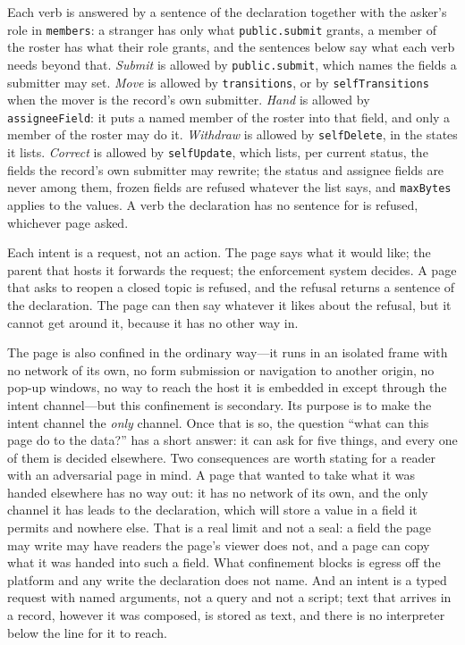 \documentclass[11pt]{article}
\begin{document}
Each verb is answered by a sentence of the declaration together with the asker's role in \texttt{members}: a stranger has only what \texttt{public.submit} grants, a member of the roster has what their role grants, and the sentences below say what each verb needs beyond that. \emph{Submit} is allowed by \texttt{public.submit}, which names the fields a submitter may set. \emph{Move} is allowed by \texttt{transitions}, or by \texttt{selfTransitions} when the mover is the record's own submitter. \emph{Hand} is allowed by \texttt{assigneeField}: it puts a named member of the roster into that field, and only a member of the roster may do it. \emph{Withdraw} is allowed by \texttt{selfDelete}, in the states it lists. \emph{Correct} is allowed by \texttt{selfUpdate}, which lists, per current status, the fields the record's own submitter may rewrite; the status and assignee fields are never among them, frozen fields are refused whatever the list says, and \texttt{maxBytes} applies to the values. A verb the declaration has no sentence for is refused, whichever page asked.

Each intent is a request, not an action. The page says what it would like; the parent that hosts it forwards the request; the enforcement system decides. A page that asks to reopen a closed topic is refused, and the refusal returns a sentence of the declaration. The page can then say whatever it likes about the refusal, but it cannot get around it, because it has no other way in.

The page is also confined in the ordinary way---it runs in an isolated frame with no network of its own, no form submission or navigation to another origin, no pop-up windows, no way to reach the host it is embedded in except through the intent channel---but this confinement is secondary. Its purpose is to make the intent channel the \emph{only} channel. Once that is so, the question ``what can this page do to the data?'' has a short answer: it can ask for five things, and every one of them is decided elsewhere. Two consequences are worth stating for a reader with an adversarial page in mind. A page that wanted to take what it was handed elsewhere has no way out: it has no network of its own, and the only channel it has leads to the declaration, which will store a value in a field it permits and nowhere else. That is a real limit and not a seal: a field the page may write may have readers the page's viewer does not, and a page can copy what it was handed into such a field. What confinement blocks is egress off the platform and any write the declaration does not name. And an intent is a typed request with named arguments, not a query and not a script; text that arrives in a record, however it was composed, is stored as text, and there is no interpreter below the line for it to reach.
\end{document}
